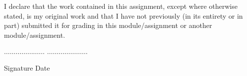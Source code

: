 
\begin{declaration} %

I declare that the work contained in this assignment, except where otherwise stated, is my original work and that I have not previously (in its entirety or in part) submitted it for grading in this module/assignment or another module/assignment.


\vspace{1cm}





$\ldots\ldots\ldots\ldots\ldots\ldots\ldots$ \tab \tab \tab \tab \tab \tab $\ldots\ldots\ldots\ldots\ldots\ldots\ldots$

\tab Signature \tab \tab \tab \tab \tab \tab \tab \tab \tab Date



\end{declaration}


